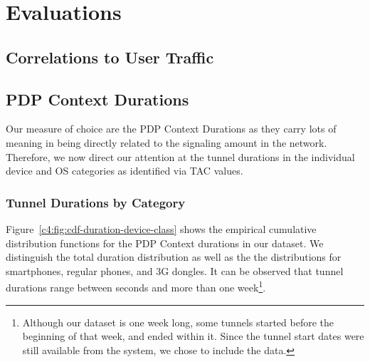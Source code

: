 \section{Evaluations}
\label{c4:sec:evaluations}







\subsection{Correlations to User Traffic}




\subsection{PDP Context Durations}

Our measure of choice are the PDP Context Durations as they carry lots of meaning in being directly related to the signaling amount in the network. Therefore, we now direct our attention at the tunnel durations in the individual device and OS categories as identified via \gls{TAC} values.


\subsubsection{Tunnel Durations by Category}

Figure~\ref{c4:fig:cdf-duration-device-class} shows the empirical cumulative distribution functions for the PDP Context durations in our dataset. We distinguish the total duration distribution as well as the the distributions for smartphones, regular phones, and 3G dongles. It can be observed that tunnel durations range between  seconds and more than one week\footnote{Although our dataset is one week long, some tunnels started before the beginning of that week, and ended within it. Since the tunnel start dates were still available from the system, we chose to include the data.}.

